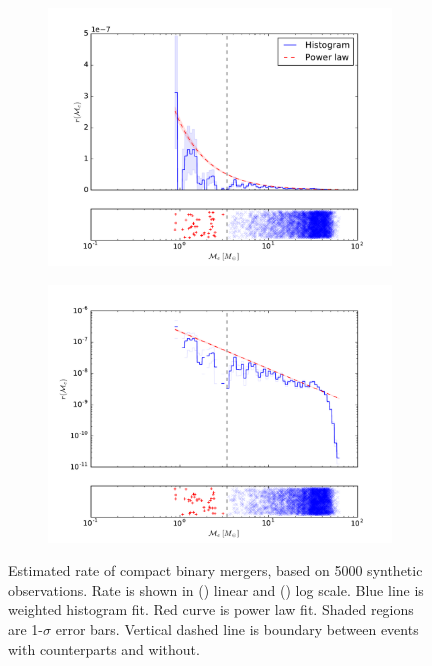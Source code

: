 \begin{figure}[ht]
  \centering
  \begin{subfigure}[c]{\textwidth}
    \centering
    \includegraphics[height=0.4\textheight]{img/chirp-mass-distribution}
    \caption{}
    \label{fig:chirp-linear}
  \end{subfigure}

  \begin{subfigure}[c]{\textwidth}
    \centering
    \includegraphics[height=0.4\textheight]{img/chirp-mass-log-distribution}
    \caption{}
    \label{fig:chirp-log}
  \end{subfigure}

  \caption{Estimated rate of compact binary mergers, based on 5000 synthetic observations. Rate is shown in () linear and () log scale. Blue line is weighted histogram fit. Red curve is power law fit. Shaded regions are 1-$\sigma$ error bars. Vertical dashed line is boundary between events with counterparts and without.}
  \label{fig:chirp}
\end{figure}